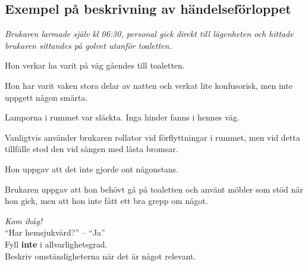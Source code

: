 \documentclass[paper=a5,DIV=15,headinclude,twoside=semi,openany,titlepage=firstiscover]{scrbook}
\begin{document}
\subsection*{Exempel på beskrivning av händelseförloppet}

{\itshape
	Brukaren larmade själv kl 06:30, personal gick direkt till lägenheten och hittade brukaren sittandes på golvet utanför toaletten. 
	
	\noindent Hon verkar ha varit på väg gåendes till toaletten. 
	
	\noindent Hon har varit vaken stora delar av natten och verkat lite konfusorisk, men inte uppgett någon smärta. 
	
	\noindent Lamporna i rummet var släckta. Inga hinder fanns i hennes väg.
	
	\noindent Vanligtvis använder brukaren rollator vid förflyttningar i rummet, men vid detta tillfälle stod den vid sängen med låsta bromsar. 
	
	\noindent Hon uppgav att det inte gjorde ont någonstans. 
	
	\noindent Brukaren uppgav att hon behövt gå på toaletten och använt möbler som stöd när hon gick, men att hon inte fått ett bra grepp om något.
}

\clearpage

\begin{center}
\Huge\textit{Kom ihåg!}\Large\\[3ex]

``Har hemsjukvård?'' -- ``Ja''\\[2ex]

Fyll \textbf{inte} i allvarlighetsgrad.\\[2ex]

Beskriv omständigheterna när det är något relevant.
\end{center}%
\end{document}
